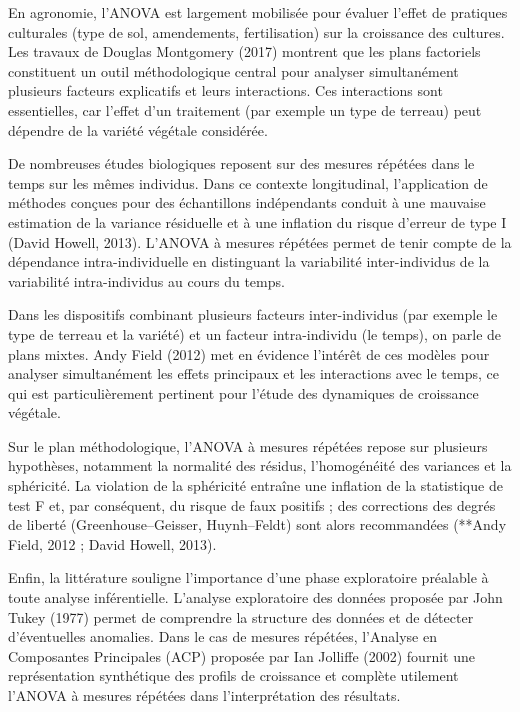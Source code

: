 \documentclass[12pt, a4paper]{report}
\begin{document}
En agronomie, l’ANOVA est largement mobilisée pour évaluer l’effet de pratiques culturales (type de sol, amendements, fertilisation) sur la croissance des cultures. Les travaux de Douglas Montgomery (2017) montrent que les plans factoriels constituent un outil méthodologique central pour analyser simultanément plusieurs facteurs explicatifs et leurs interactions. Ces interactions sont essentielles, car l’effet d’un traitement (par exemple un type de terreau) peut dépendre de la variété végétale considérée.

De nombreuses études biologiques reposent sur des mesures répétées dans le temps sur les mêmes individus. Dans ce contexte longitudinal, l’application de méthodes conçues pour des échantillons indépendants conduit à une mauvaise estimation de la variance résiduelle et à une inflation du risque d’erreur de type I (David Howell, 2013). L’ANOVA à mesures répétées permet de tenir compte de la dépendance intra-individuelle en distinguant la variabilité inter-individus de la variabilité intra-individus au cours du temps.

Dans les dispositifs combinant plusieurs facteurs inter-individus (par exemple le type de terreau et la variété) et un facteur intra-individu (le temps), on parle de plans mixtes. Andy Field (2012) met en évidence l’intérêt de ces modèles pour analyser simultanément les effets principaux et les interactions avec le temps, ce qui est particulièrement pertinent pour l’étude des dynamiques de croissance végétale.

Sur le plan méthodologique, l’ANOVA à mesures répétées repose sur plusieurs hypothèses, notamment la normalité des résidus, l’homogénéité des variances et la sphéricité. La violation de la sphéricité entraîne une inflation de la statistique de test F et, par conséquent, du risque de faux positifs ; des corrections des degrés de liberté (Greenhouse–Geisser, Huynh–Feldt) sont alors recommandées (**Andy Field, 2012 ; David Howell, 2013).

Enfin, la littérature souligne l’importance d’une phase exploratoire préalable à toute analyse inférentielle. L’analyse exploratoire des données proposée par John Tukey (1977) permet de comprendre la structure des données et de détecter d’éventuelles anomalies. Dans le cas de mesures répétées, l’Analyse en Composantes Principales (ACP) proposée par Ian Jolliffe (2002) fournit une représentation synthétique des profils de croissance et complète utilement l’ANOVA à mesures répétées dans l’interprétation des résultats.
\end{document}

